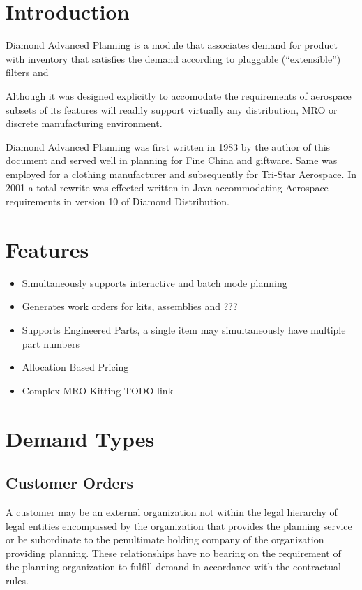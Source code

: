 \documentclass[letterpaper,10pt,english]{sphinxmanual}
\begin{document}
\section{Introduction}
\label{APS/Functional:introduction}
Diamond Advanced Planning is a module that associates demand for product
with inventory that satisfies the demand according to pluggable
(“extensible”) filters and

Although it was designed explicitly to accomodate the requirements of
aerospace subsets of its features will readily support virtually any
distribution, MRO or discrete manufacturing environment.

Diamond Advanced Planning was first written in 1983 by the author of
this document and served well in planning for Fine China and giftware.
Same was employed for a clothing manufacturer and subsequently for
Tri-Star Aerospace. In 2001 a total rewrite was effected written in Java
accommodating Aerospace requirements in version 10 of Diamond
Distribution.


\section{Features}
\label{APS/Functional:features}\begin{itemize}
\item {} 
Simultaneously supports interactive and batch mode planning

\item {} 
Generates work orders for kits, assemblies and ???

\item {} 
Supports Engineered Parts, a single item may simultaneously have
multiple part numbers

\item {} 
Allocation Based Pricing

\item {} 
Complex MRO Kitting TODO link

\end{itemize}


\section{Demand Types}
\label{APS/Functional:demand-types}

\subsection{Customer Orders}
\label{APS/Functional:customer-orders}
A customer may be an external organization not within the legal
hierarchy of legal entities encompassed by the organization that
provides the planning service or be subordinate to the penultimate
holding company of the organization providing planning. These
relationships have no bearing on the requirement of the planning
organization to fulfill demand in accordance with the contractual rules.
\end{document}
